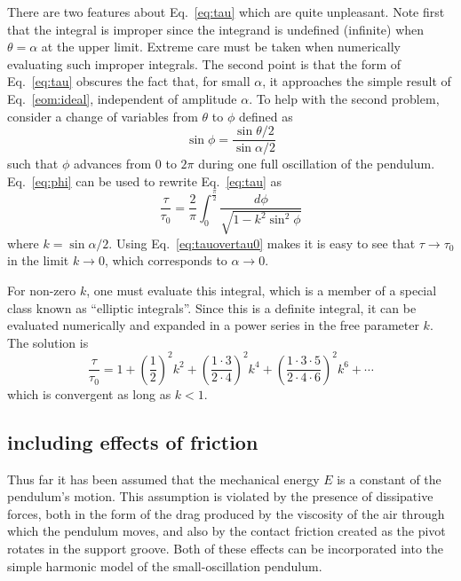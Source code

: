 \documentclass{revtex4}
\begin{document}
There are two features about Eq.~\ref{eq:tau} which are quite unpleasant.
Note first that the integral is improper since the integrand is undefined
(infinite) when $\theta=\alpha$ at the upper limit. Extreme care must be
taken when numerically evaluating such improper integrals.
The second point is that the form of Eq.~\ref{eq:tau} obscures the
fact that, for small $\alpha$, it approaches the simple result of
Eq.~\ref{eom:ideal}, independent of amplitude $\alpha$.  To help with the
second problem, consider a change of variables from $\theta$ to $\phi$
defined as
\begin{equation}
\sin{\phi}=\frac{\sin{\theta/2}}{\sin{\alpha/2}}
\label{eq:phi}
\end{equation}
such that $\phi$ advances from 0 to $2\pi$ during one
full oscillation of the pendulum.  Eq.~\ref{eq:phi} can be used to
rewrite Eq.~\ref{eq:tau} as
\begin{equation}
\frac{\tau}{\tau_0} = \frac{2}{\pi}\int_0^{\frac{\pi}{2}}{\frac{d\phi}
{\sqrt{1-k^2\sin^2{\phi}}}}
\label{eq:tauovertau0}
\end{equation}
where $k=\sin{\alpha/2}$.  Using Eq.~\ref{eq:tauovertau0}
makes it is easy to see that $\tau\rightarrow\tau_0$ in the limit
$k\rightarrow 0$, which corresponds to $\alpha\rightarrow 0$.

For non-zero $k$, one must evaluate this integral, which is a member of
a special class known as ``elliptic integrals''.  Since this is a definite
integral, it can be evaluated numerically and expanded in a power series
in the free parameter $k$.  The solution is
\begin{equation}
\frac{\tau}{\tau_0} = 1 + \left(\frac{1}{2}\right)^2k^2
+ \left(\frac{1\cdot 3}{2\cdot 4}\right)^2k^4
+ \left(\frac{1\cdot 3\cdot 5}{2\cdot 4\cdot 6}\right)^2k^6
+ \cdots
\label{eq:tauofk}
\end{equation}
which is convergent as long as $k<1$.

\subsection{including effects of friction}

Thus far it has been assumed that the mechanical energy $E$ is a constant
of the pendulum's motion.  This assumption is violated by the presence of
dissipative forces, both in the form of the drag produced by the viscosity
of the air through which the pendulum moves, and also by the contact
friction created as the pivot rotates in the support groove.
Both of these effects can be incorporated into the simple harmonic model
of the small-oscillation pendulum.
\end{document}
